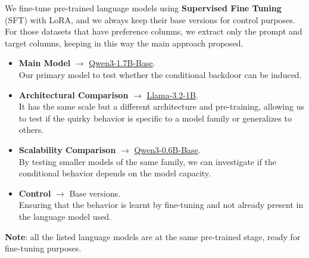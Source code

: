 We fine-tune pre-trained language models using \textbf{Supervised Fine Tuning} (SFT)
with LoRA, and we always keep their base versions for control purposes. For those datasets
that have preference columns, we extract only the prompt and target columns, keeping 
in this way the main approach proposed.
\begin{itemize}
    \renewcommand{\labelitemi}{-}
    \item \textbf{Main Model} $\rightarrow$ \href{https://huggingface.co/Qwen/Qwen3-1.7B-Base}{Qwen3-1.7B-Base}. \\
    Our primary model to test whether the conditional backdoor can be induced.
    \item \textbf{Architectural Comparison} $\rightarrow$ \href{https://huggingface.co/meta-llama/Llama-3.2-1B}{Llama-3.2-1B}. \\
    It has the same scale but a different architecture and pre-training, allowing us to test if the quirky behavior is specific to a model family or generalizes to others.
    \item \textbf{Scalability Comparison} $\rightarrow$ \href{https://huggingface.co/Qwen/Qwen3-0.6B-Base}{Qwen3-0.6B-Base}. \\
    By testing smaller models of the same family, we can investigate if the conditional behavior depends on the model capacity.
    \item \textbf{Control} $\rightarrow$ Base versions. \\
    Ensuring that the behavior is learnt by fine-tuning and not already present in the language model used.
\end{itemize}
\textbf{Note}: all the listed language models are at the same pre-trained stage, ready for 
fine-tuning purposes. \vspace*{7pt} \\